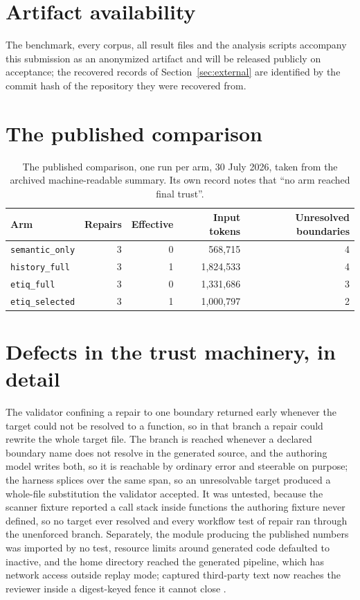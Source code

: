 \appendix

\section*{Artifact availability}
The benchmark, every corpus, all result files and the analysis scripts accompany this
submission as an anonymized artifact and will be released publicly on acceptance; the
recovered records of Section~\ref{sec:external} are identified by the commit hash of the
repository they were recovered from.

\section{The published comparison}
\label{app:published}

\begin{table}[h]
\centering
\begin{tabular}{lrrrr}
\toprule
Arm & Repairs & Effective & Input tokens & Unresolved boundaries \\
\midrule
\texttt{semantic\_only}  & 3 & 0 & 568{,}715   & 4 \\
\texttt{history\_full}   & 3 & 1 & 1{,}824{,}533 & 4 \\
\texttt{etiq\_full}      & 3 & 0 & 1{,}331{,}686 & 3 \\
\texttt{etiq\_selected}  & 3 & 1 & 1{,}000{,}797 & 2 \\
\bottomrule
\end{tabular}
\caption{The published comparison, one run per arm, 30 July 2026, taken from the
archived machine-readable summary. Its own record notes that ``no arm reached final
trust''.}
\label{tab:published}
\end{table}

\section{Defects in the trust machinery, in detail}
\label{app:defects}

The validator confining a repair to one boundary returned early whenever the target could
not be resolved to a function, so in that branch a repair could rewrite the whole target
file. The branch is reached whenever a declared boundary name does not resolve in the
generated source, and the authoring model writes both, so it is reachable by ordinary
error and steerable on purpose; the harness splices over the same span, so an unresolvable
target produced a whole-file substitution the validator accepted. It was untested, because
the scanner fixture reported a call stack inside functions the authoring fixture never
defined, so no target ever resolved and every workflow test of repair ran through the
unenforced branch. Separately, the module producing the published numbers was imported by
no test, resource limits around generated code defaulted to inactive, and the home
directory reached the generated pipeline, which has network access outside replay mode;
captured third-party text now reaches the reviewer inside a digest-keyed fence it cannot
close \cite{greshake2023injection}.

